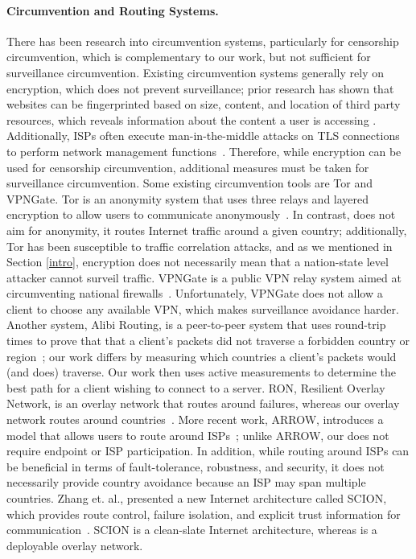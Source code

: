 \paragraph{Circumvention and Routing Systems.}  There has been research into
circumvention systems, particularly for censorship circumvention, which is 
complementary to our work, but not sufficient for surveillance circumvention.  
Existing circumvention systems generally rely on encryption, which does not 
prevent surveillance; prior research has shown that websites can be 
fingerprinted based on size, content, and location of third party resources, which 
reveals information about the content a user is accessing \cite{what_isps_can_see}.  Additionally, 
ISPs often execute man-in-the-middle attacks on TLS connections to perform 
network management functions~\cite{mitm_isp}.  Therefore, while encryption can be 
used for censorship circumvention, additional measures must be taken for 
surveillance circumvention.  Some existing circumvention tools are Tor and VPNGate.
Tor is an anonymity system that uses three relays and layered encryption
to allow users to communicate anonymously~\cite{dingledine2004tor}.  In contrast, \system{}
does not aim for anonymity, it routes Internet traffic around a given country; additionally, 
Tor has been susceptible to traffic correlation attacks, and as we mentioned in Section \ref{intro}, 
encryption does not necessarily mean that a nation-state level attacker cannot surveil traffic.
VPNGate is a public VPN relay system aimed at circumventing national
firewalls~\cite{nobori2014vpn}.  Unfortunately, VPNGate does not allow a
client to choose any available VPN, which makes surveillance avoidance
harder.  Another system, Alibi Routing, is a peer-to-peer system that 
uses round-trip times to prove that that a client's packets did 
not traverse a forbidden country or region~\cite{levin2015alibi}; our work differs by measuring 
which countries a client's packets would (and does) traverse.  Our work then 
uses active measurements to determine the best path for a client wishing 
to connect to a server.  RON, Resilient Overlay Network, is an overlay network that 
routes around failures, whereas our overlay network routes around countries~\cite{andersen2001resilient}.  
More recent work, ARROW, introduces a model that allows users to route around ISPs~\cite{peter2015one}; unlike ARROW, 
our \system{} does not require endpoint or ISP participation.  In addition, while routing around ISPs 
can be beneficial in terms of fault-tolerance, robustness, and security, it does not necessarily provide 
country avoidance because an ISP may span multiple countries.  Zhang et. al., presented a new Internet 
architecture called SCION, which provides route control, failure isolation, and explicit trust information for 
communication~\cite{zhang2011scion}.  SCION is a clean-slate Internet architecture, whereas \system{} is a deployable overlay 
network.

